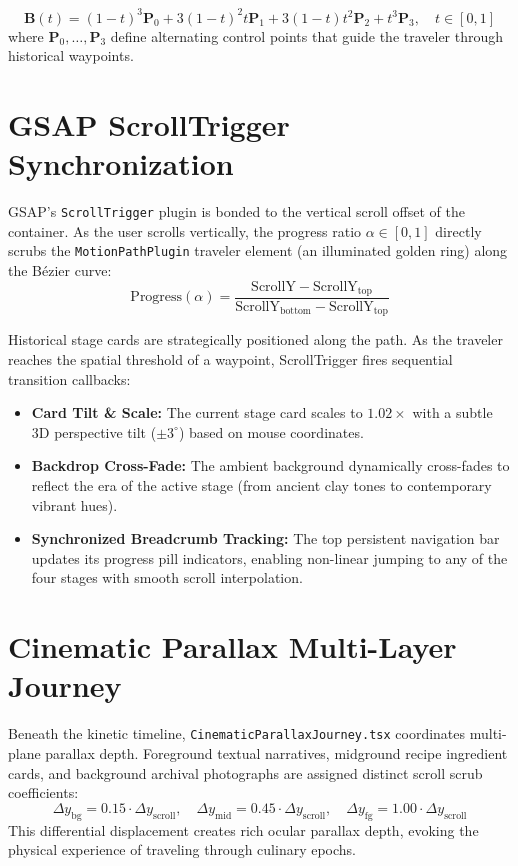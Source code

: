\documentclass[11pt,a4paper]{report}
\begin{document}
\begin{equation}
    \mathbf{B}(t) = (1-t)^3 \mathbf{P}_0 + 3(1-t)^2 t \mathbf{P}_1 + 3(1-t) t^2 \mathbf{P}_2 + t^3 \mathbf{P}_3, \quad t \in [0, 1]
\end{equation}
where $\mathbf{P}_0, \dots, \mathbf{P}_3$ define alternating control points that guide the traveler through historical waypoints.

\section{GSAP ScrollTrigger Synchronization}
GSAP's \texttt{ScrollTrigger} plugin is bonded to the vertical scroll offset of the container. As the user scrolls vertically, the progress ratio $\alpha \in [0, 1]$ directly scrubs the \texttt{MotionPathPlugin} traveler element (an illuminated golden ring) along the Bézier curve:
\begin{equation}
    \text{Progress}(\alpha) = \frac{\text{ScrollY} - \text{ScrollY}_{\text{top}}}{\text{ScrollY}_{\text{bottom}} - \text{ScrollY}_{\text{top}}}
\end{equation}

Historical stage cards are strategically positioned along the path. As the traveler reaches the spatial threshold of a waypoint, ScrollTrigger fires sequential transition callbacks:
\begin{itemize}
    \item \textbf{Card Tilt \& Scale:} The current stage card scales to $1.02\times$ with a subtle 3D perspective tilt ($\pm 3^\circ$) based on mouse coordinates.
    \item \textbf{Backdrop Cross-Fade:} The ambient background dynamically cross-fades to reflect the era of the active stage (from ancient clay tones to contemporary vibrant hues).
    \item \textbf{Synchronized Breadcrumb Tracking:} The top persistent navigation bar updates its progress pill indicators, enabling non-linear jumping to any of the four stages with smooth scroll interpolation.
\end{itemize}

\section{Cinematic Parallax Multi-Layer Journey}
Beneath the kinetic timeline, \texttt{CinematicParallaxJourney.tsx} coordinates multi-plane parallax depth. Foreground textual narratives, midground recipe ingredient cards, and background archival photographs are assigned distinct scroll scrub coefficients:
\begin{equation}
    \Delta y_{\text{bg}} = 0.15 \cdot \Delta y_{\text{scroll}}, \quad \Delta y_{\text{mid}} = 0.45 \cdot \Delta y_{\text{scroll}}, \quad \Delta y_{\text{fg}} = 1.00 \cdot \Delta y_{\text{scroll}}
\end{equation}
This differential displacement creates rich ocular parallax depth, evoking the physical experience of traveling through culinary epochs.
\end{document}

